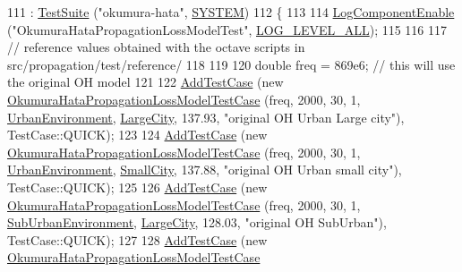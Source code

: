 \begin{DoxyCode}
111   : \hyperlink{classns3_1_1TestSuite_a904b0c40583b744d30908aeb94636d1a}{TestSuite} (\textcolor{stringliteral}{"okumura-hata"}, \hyperlink{classns3_1_1TestSuite_a1ebfcab34ec8161e085e8e3a1855eae0a90c5529a26ab3a5ffcc6e57040dbd82e}{SYSTEM})
112 \{
113 
114   \hyperlink{namespacens3_adc4ef4f00bb2f5f4edae67fc3bc27f20}{LogComponentEnable} (\textcolor{stringliteral}{"OkumuraHataPropagationLossModelTest"}, 
      \hyperlink{namespacens3_aa6464a4d69551a9cc968e17a65f39bdba022b1237a4fd1b08d034471df3c58586}{LOG\_LEVEL\_ALL});
115 
116 
117   \textcolor{comment}{// reference values obtained with the octave scripts in src/propagation/test/reference/}
118 
119 
120   \textcolor{keywordtype}{double} freq = 869e6; \textcolor{comment}{// this will use the original OH model}
121 
122   \hyperlink{classns3_1_1TestCase_a3718088e3eefd5d6454569d2e0ddd835}{AddTestCase} (\textcolor{keyword}{new} \hyperlink{classOkumuraHataPropagationLossModelTestCase}{OkumuraHataPropagationLossModelTestCase}
       (freq, 2000, 30, 1, \hyperlink{group__propagation_gga0e392ed771a28c92112047e63308a53aad575d1b07ccac0218783bbd0f523784c}{UrbanEnvironment}, \hyperlink{group__propagation_gga29c9a1b1a58b6a56054ff5ea4c5a574da017d6be2af0a102a6147e6519d63f54c}{LargeCity}, 137.93, \textcolor{stringliteral}{"original OH Urban Large
       city"}), TestCase::QUICK);
123 
124   \hyperlink{classns3_1_1TestCase_a3718088e3eefd5d6454569d2e0ddd835}{AddTestCase} (\textcolor{keyword}{new} \hyperlink{classOkumuraHataPropagationLossModelTestCase}{OkumuraHataPropagationLossModelTestCase}
       (freq, 2000, 30, 1, \hyperlink{group__propagation_gga0e392ed771a28c92112047e63308a53aad575d1b07ccac0218783bbd0f523784c}{UrbanEnvironment}, \hyperlink{group__propagation_gga29c9a1b1a58b6a56054ff5ea4c5a574dad3f856f2f166ae12798befabfbd2c99e}{SmallCity}, 137.88, \textcolor{stringliteral}{"original OH Urban small
       city"}), TestCase::QUICK);
125 
126   \hyperlink{classns3_1_1TestCase_a3718088e3eefd5d6454569d2e0ddd835}{AddTestCase} (\textcolor{keyword}{new} \hyperlink{classOkumuraHataPropagationLossModelTestCase}{OkumuraHataPropagationLossModelTestCase}
       (freq, 2000, 30, 1, \hyperlink{group__propagation_gga0e392ed771a28c92112047e63308a53aa06cbfe108cde1eb2070702b2ed4fb189}{SubUrbanEnvironment}, \hyperlink{group__propagation_gga29c9a1b1a58b6a56054ff5ea4c5a574da017d6be2af0a102a6147e6519d63f54c}{LargeCity}, 128.03, \textcolor{stringliteral}{"original OH
       SubUrban"}), TestCase::QUICK);
127 
128   \hyperlink{classns3_1_1TestCase_a3718088e3eefd5d6454569d2e0ddd835}{AddTestCase} (\textcolor{keyword}{new} \hyperlink{classOkumuraHataPropagationLossModelTestCase}{OkumuraHataPropagationLossModelTestCase}

\end{DoxyCode}
